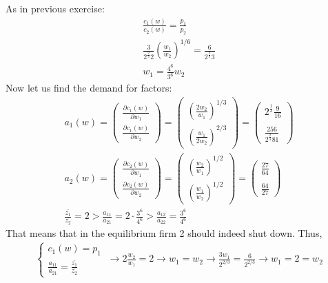 \documentclass[a4paper]{article}
\begin{document}
As in previous exercise:
\begin{align*}
\frac{c_1(w)}{c_2(w)} = \frac{p_1}{p_2}\\ \frac{3}{2^{\frac{2}{3}}2}\left(\frac{w_1}{w_2}\right)^{1/6} = \frac{6}{2^{\frac{2}{3}}3}\\
w_1 = \frac{4^6}{3^6}w_2
\end{align*}
Now let us find the demand for factors:
\begin{align*}
a_1(w) = \begin{pmatrix}
\frac{\partial c_1(w)}{\partial w_1}\\
\frac{\partial c_1(w)}{\partial w_2}
\end{pmatrix} = \begin{pmatrix}
\left(\frac{2w_2}{w_1}\right)^{1/3}\\
\left(\frac{w_1}{2w_2}\right)^{2/3}
\end{pmatrix} = \begin{pmatrix}
2^{\frac{1}{3}}\frac{9}{16}\\
\\
\frac{256}{2^{\frac{2}{3}}81}
\end{pmatrix}\\
a_2(w) = \begin{pmatrix}
\frac{\partial c_2(w)}{\partial w_1}\\
\frac{\partial c_2(w)}{\partial w_2}
\end{pmatrix} = \begin{pmatrix}
\left(\frac{w_2}{w_1}\right)^{1/2}\\
\left(\frac{w_1}{w_2}\right)^{1/2}
\end{pmatrix} = \begin{pmatrix}
\frac{27}{64}\\
\\
\frac{64}{27}
\end{pmatrix}\\
\frac{\bar{z_1}}{\bar{z_2}}  = 2 > \frac{a_{11}}{a_{21}} = 2\cdot \frac{3^6}{4^6} > \frac{a_{12}}{a_{22}} = \frac{3^6}{4^6}
\end{align*}
That means that in the equilibrium firm 2 should indeed shut down. Thus, 
\begin{align*}
\begin{cases}
c_1(w) = p_1\\
\frac{a_{11}}{a_{21}} = \frac{\bar{z_1}}{\bar{z_2}}
\end{cases}\ \to 2\frac{w_2}{w_1} = 2 \to w_1 = w_2 \to \frac{3w_1}{2^{2/3}} = \frac{6}{2^{2/3}} \to w_1 = 2 = w_2
\end{align*}
\end{document}
